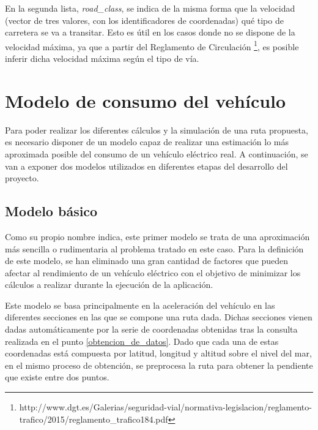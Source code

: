 \documentclass[11pt,spanish,listoffigures,listoftables]{tfgetsinf}
\begin{document}
En la segunda lista, \textit{road\_class}, se indica de la misma forma que la velocidad (vector de tres valores, con los identificadores de coordenadas) qué tipo de carretera se va a transitar. Esto es útil en los casos donde no se dispone de la velocidad máxima, ya que a partir del Reglamento de Circulación \footnote{http://www.dgt.es/Galerias/seguridad-vial/normativa-legislacion/reglamento-trafico/2015/reglamento\_trafico184.pdf}, es posible inferir dicha velocidad máxima según el tipo de vía.

\newpage
\section{Modelo de consumo del vehículo}
Para poder realizar los diferentes cálculos y la simulación de una ruta propuesta, es necesario disponer de un modelo capaz de realizar una estimación lo más aproximada posible del consumo de un vehículo eléctrico real. A continuación, se van a exponer dos modelos utilizados en diferentes etapas del desarrollo del proyecto.

\subsection{Modelo básico}
Como su propio nombre indica, este primer modelo se trata de una aproximación más sencilla o rudimentaria al problema tratado en este caso. Para la definición de este modelo, se han eliminado una gran cantidad de factores que pueden afectar al rendimiento de un vehículo eléctrico con el objetivo de minimizar los cálculos a realizar durante la ejecución de la aplicación.

Este modelo se basa principalmente en la aceleración del vehículo en las diferentes secciones en las que se compone una ruta dada. Dichas secciones vienen dadas automáticamente por la serie de coordenadas obtenidas tras la consulta realizada en el punto \ref{obtencion_de_datos}. Dado que cada una de estas coordenadas está compuesta por latitud, longitud y altitud sobre el nivel del mar, en el mismo proceso de obtención, se preprocesa la ruta para obtener la pendiente que existe entre dos puntos.
\end{document}
